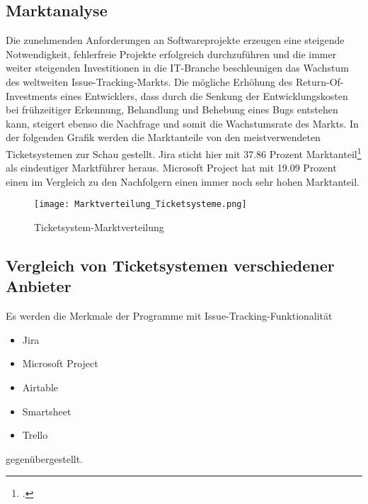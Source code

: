 \subsection{Marktanalyse}  
Die zunehmenden Anforderungen an Softwareprojekte erzeugen eine steigende Notwendigkeit, fehlerfreie Projekte erfolgreich durchzuführen und die immer weiter steigenden Investitionen in die IT-Branche beschleunigen das Wachstum des weltweiten Issue-Tracking-Markts.
Die mögliche Erhöhung des Return-Of-Investments eines Entwicklers, dass durch die Senkung der Entwicklungskosten bei frühzeitiger Erkennung, Behandlung und Behebung eines Bugs entstehen kann, steigert ebenso die Nachfrage und somit die Wachstumsrate des Markts.
In der folgenden Grafik werden die Marktanteile von den meistverwendeten Ticketsystemen zur Schau gestellt.
Jira sticht hier mit 37.86 Prozent Marktanteil\footcite{marktanteile} als eindeutiger Marktführer heraus. Microsoft Project hat mit 19.09 Prozent einen im Vergleich zu den Nachfolgern einen immer noch sehr hohen Marktanteil.
\begin{figure}[H]
 	\centering
	\texttt{[image: Marktverteilung\_Ticketsysteme.png]}
	\caption{Ticketsystem-Marktverteilung}
\end{figure}   
\subsection{Vergleich von Ticketsystemen verschiedener Anbieter}
Es werden die Merkmale der Programme mit Issue-Tracking-Funktionalität
\begin{itemize}
	\item Jira
	\item Microsoft Project
	\item Airtable
	\item Smartsheet
	\item Trello
\end{itemize}
gegenübergestellt.   
